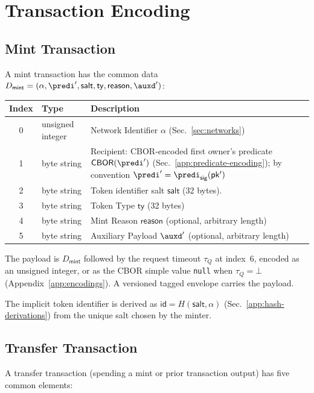 \section{Transaction Encoding}\label{app:transaction-encoding}

\subsection{Mint Transaction}

A mint transaction has the common data
$D_\mathsf{mint} = (\alpha, \predi', \mathsf{salt}, \mathsf{ty}, \mathsf{reason}, \auxd')$:

\begin{longtable}{clp{10cm}}
\textbf{Index} & \textbf{Type} & \textbf{Description} \\
\hline
0 & unsigned integer & Network Identifier $\alpha$ (Sec.~\ref{sec:networks}) \\
1 & byte string & Recipient: CBOR-encoded first owner's predicate $\mathsf{CBOR}(\predi')$ (Sec.~\ref{app:predicate-encoding}); by convention $\predi' = \predi_\mathsf{sig}(\mathsf{pk'})$ \\
2 & byte string & Token identifier salt $\mathsf{salt}$ (32 bytes). \\
3 & byte string & Token Type $\mathsf{ty}$ (32 bytes) \\
4 & byte string & Mint Reason $\mathsf{reason}$ (optional, arbitrary length) \\
5 & byte string & Auxiliary Payload $\auxd'$ (optional, arbitrary length) \\
\end{longtable}

The payload is $D_\mathsf{mint}$ followed by the request timeout $\tau_Q$ at index~6, encoded as an unsigned integer, or as the CBOR simple value \texttt{null} when $\tau_Q=\bot$ (Appendix~\ref{app:encodings}). A versioned tagged envelope carries the payload.

The implicit token identifier is derived as $\mathsf{id} = H(\mathsf{salt}, \alpha)$ (Sec.~\ref{app:hash-derivations}) from the unique salt chosen by the minter.

\subsection{Transfer Transaction}

A transfer transaction (spending a mint or prior transaction output) has five common elements:

